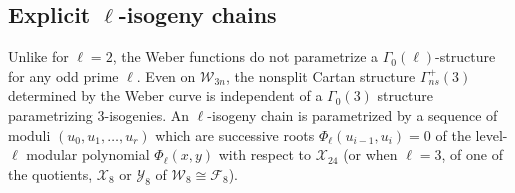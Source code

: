\documentclass{amsart}
\newcommand{\cF}{\mathcal{F}}
\newcommand{\cX}{\mathcal{X}}
\newcommand{\cY}{\mathcal{Y}}
\newcommand{\cW}{\mathcal{W}}
\newcommand{\isom}{\cong}
\begin{document}

\subsection*{Explicit $\ell$-isogeny chains}

Unlike for $\ell = 2$, the Weber functions do not parametrize a
$\Gamma_0(\ell)$-structure for any odd prime $\ell$.
Even on $\cW_{3n}$, the nonsplit Cartan structure $\Gamma_{ns}^+(3)$
determined by the Weber curve is independent of a $\Gamma_0(3)$
structure parametrizing $3$-isogenies.
An $\ell$-isogeny chain is parametrized by a sequence of moduli
$(u_0,u_1,\dots,u_r)$ which are successive roots
$\Phi_\ell(u_{i-1},u_i) = 0$ of the level-$\ell$ modular polynomial
$\Phi_\ell(x,y)$ with respect to $\cX_{24}$
(or when $\ell = 3$, of one of the quotients, $\cX_8$ or $\cY_8$
of $\cW_8 \isom \cF_8$).

\end{document}
